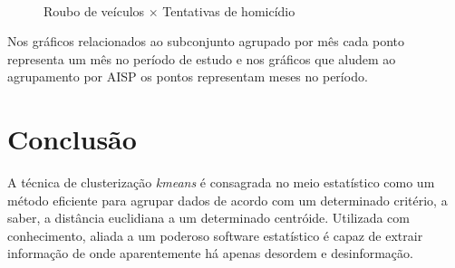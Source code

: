 \documentclass[a4paper, 12pt]{article}
\begin{document}
	\begin{figure}[H]
		\centering
		~
		\caption{Roubo de veículos $\times$ Tentativas de homicídio}
		\label{fig:rouboHom}
	\end{figure}
	\begin{multicols}{2}	
		Nos gráficos relacionados ao subconjunto agrupado por mês cada ponto representa um mês no período de estudo e nos gráficos que aludem ao agrupamento por AISP os pontos representam meses no período.  
		
		\section{Conclusão}
		A técnica de clusterização \textit{kmeans} é consagrada no meio estatístico como um método eficiente para agrupar dados de acordo com um determinado critério, a saber, a distância euclidiana a um determinado centróide.  Utilizada com conhecimento, aliada a um poderoso software estatístico é capaz de extrair informação de onde aparentemente há apenas desordem e desinformação.
	\end{multicols}
\end{document}
